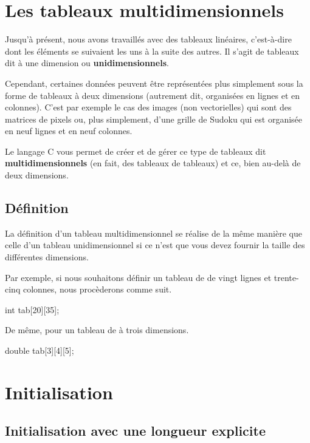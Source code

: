 \section{Les tableaux multidimensionnels}
\label{les-tableaux-multidimensionnels}

Jusqu'à présent, nous avons travaillés avec des tableaux linéaires,
c'est-à-dire dont les éléments se suivaient les uns à la suite des
autres. Il s'agit de tableaux dit à une dimension ou
\textbf{unidimensionnels}.

Cependant, certaines données peuvent être représentées plus simplement
sous la forme de tableaux à deux dimensions (autrement dit, organisées
en lignes et en colonnes). C'est par exemple le cas des images (non
vectorielles) qui sont des matrices de pixels ou, plus simplement, d'une
grille de Sudoku qui est organisée en neuf lignes et en neuf colonnes.

Le langage C vous permet de créer et de gérer ce type de tableaux dit
\textbf{multidimensionnels} (en fait, des tableaux de tableaux) et ce,
bien au-delà de deux dimensions.

\subsection{Définition}
\label{definition-2}

La définition d'un tableau multidimensionnel se réalise de la même
manière que celle d'un tableau unidimensionnel si ce n'est que vous
devez fournir la taille des différentes dimensions.

Par exemple, si nous souhaitons définir un tableau de  de
vingt lignes et trente-cinq colonnes, nous procèderons comme suit.

\begin{C}
int tab[20][35];
\end{C}

De même, pour un tableau de  à trois dimensions.

\begin{C}
double tab[3][4][5];
\end{C}

\section{Initialisation}
\label{initialisation-5}

\subsection{Initialisation avec une longueur explicite}
\label{initialisation-avec-une-longueur-explicite-2}


